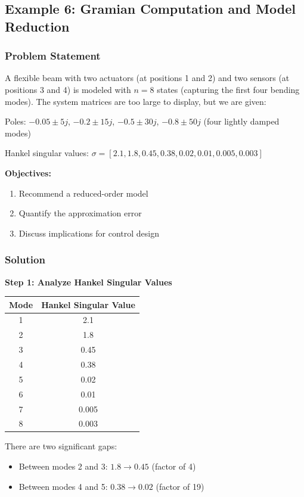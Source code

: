 \subsection{Example 6: Gramian Computation and Model Reduction}

\subsubsection{Problem Statement}

A flexible beam with two actuators (at positions 1 and 2) and two sensors (at positions 3 and 4) is modeled with $n = 8$ states (capturing the first four bending modes). The system matrices are too large to display, but we are given:

Poles: $-0.05 \pm 5j$, $-0.2 \pm 15j$, $-0.5 \pm 30j$, $-0.8 \pm 50j$ (four lightly damped modes)

Hankel singular values: $\sigma = [2.1, 1.8, 0.45, 0.38, 0.02, 0.01, 0.005, 0.003]$

\textbf{Objectives:}
\begin{enumerate}
\item Recommend a reduced-order model
\item Quantify the approximation error
\item Discuss implications for control design
\end{enumerate}

\subsubsection{Solution}

\textbf{Step 1: Analyze Hankel Singular Values}

\begin{center}
\begin{tabular}{cc}
\toprule
Mode & Hankel Singular Value \\
\midrule
1 & 2.1 \\
2 & 1.8 \\
3 & 0.45 \\
4 & 0.38 \\
5 & 0.02 \\
6 & 0.01 \\
7 & 0.005 \\
8 & 0.003 \\
\bottomrule
\end{tabular}
\end{center}

There are two significant gaps:
\begin{itemize}
\item Between modes 2 and 3: $1.8 \to 0.45$ (factor of 4)
\item Between modes 4 and 5: $0.38 \to 0.02$ (factor of 19)
\end{itemize}

